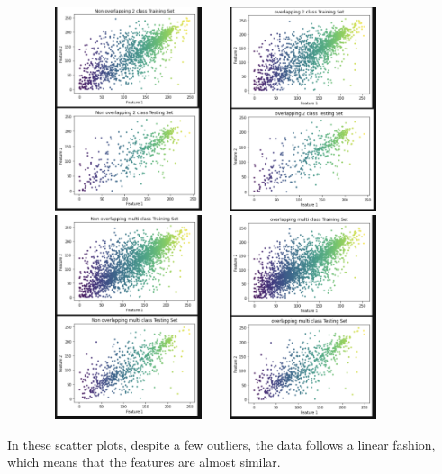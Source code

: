 \documentclass[conference]{IEEEtran}
\begin{document}
\begin{figure}
    \centering
    \includegraphics[width=5cm, height=6cm]{task1.13.png} 
    \includegraphics[width=5cm, height=6cm]{task1.14.png}
    \includegraphics[width=5cm, height=6cm]{task1.15.png}
    \includegraphics[width=5cm, height=6cm]{task1.16.png}
    \label{fig:my_label}
\end{figure}
In these scatter plots, despite a few outliers, the data follows a linear fashion, which means that the features are almost similar.
\pagebreak
\end{document}
